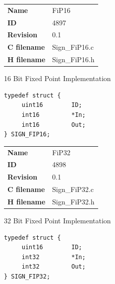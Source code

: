 \ifdefined \AddTestReports
{}
\fi
{}
\nopagebreak[0]
\begin{tabular}{l l}
\textbf{Name} & FiP16 \tabularnewline
\textbf{ID} & 4897 \tabularnewline
\textbf{Revision} & 0.1 \tabularnewline
\textbf{C filename} & Sign\_FiP16.c \tabularnewline
\textbf{H filename} & Sign\_FiP16.h \tabularnewline
\end{tabular}
\vspace{1ex}

16 Bit Fixed Point Implementation

\begin{lstlisting}
typedef struct {
     uint16        ID;
     int16         *In;
     int16         Out;
} SIGN_FIP16;
\end{lstlisting}

\ifdefined \AddTestReports
{}
\fi
{}
\nopagebreak[0]
\begin{tabular}{l l}
\textbf{Name} & FiP32 \tabularnewline
\textbf{ID} & 4898 \tabularnewline
\textbf{Revision} & 0.1 \tabularnewline
\textbf{C filename} & Sign\_FiP32.c \tabularnewline
\textbf{H filename} & Sign\_FiP32.h \tabularnewline
\end{tabular}
\vspace{1ex}

32 Bit Fixed Point Implementation

\begin{lstlisting}
typedef struct {
     uint16        ID;
     int32         *In;
     int32         Out;
} SIGN_FIP32;
\end{lstlisting}

\ifdefined \AddTestReports
{}
\fi
